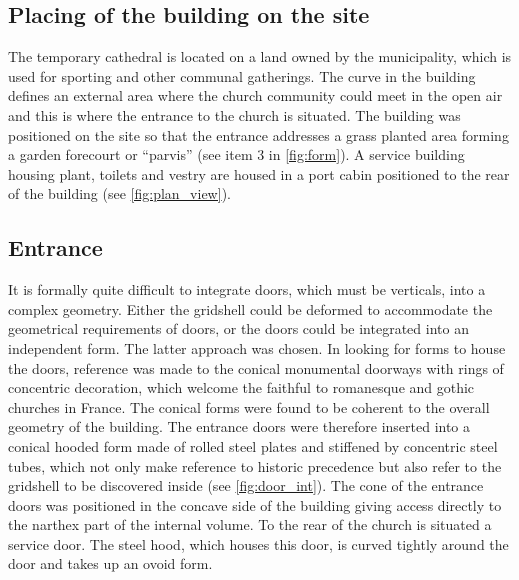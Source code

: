 \subsection{Placing of the building on the site}
The temporary cathedral is located on a land owned by the municipality, which is used for sporting and other communal gatherings. The curve in the building defines an external area where the church community could meet in the open air and this is where the entrance to the church is situated. The building was positioned on the site so that the entrance addresses a grass planted area forming a garden forecourt or “parvis” (see item 3 in \cref{fig:form}). A service building housing plant, toilets and vestry are housed in a port cabin positioned to the rear of the building (see \cref{fig:plan_view}).

\subsection{Entrance}
It is formally quite difficult to integrate doors, which must be verticals, into a complex geometry. Either the gridshell could be deformed to accommodate the geometrical requirements of doors, or the doors could be integrated into an independent form. The latter approach was chosen. In looking for forms to house the doors, reference was made to the conical monumental doorways with rings of concentric decoration, which welcome the faithful to romanesque and gothic churches in France. The conical forms were found to be coherent to the overall geometry of the building. The entrance doors were therefore inserted into a conical hooded form made of rolled steel plates and stiffened by concentric steel tubes, which not only make reference to historic precedence but also refer to the gridshell to be discovered inside (see \cref{fig:door_int}). The cone of the entrance doors was positioned in the concave side of the building giving access directly to the narthex part of the internal volume. To the rear of the church is situated a service door. The steel hood, which houses this door, is curved tightly around the door and takes up an ovoid form.

